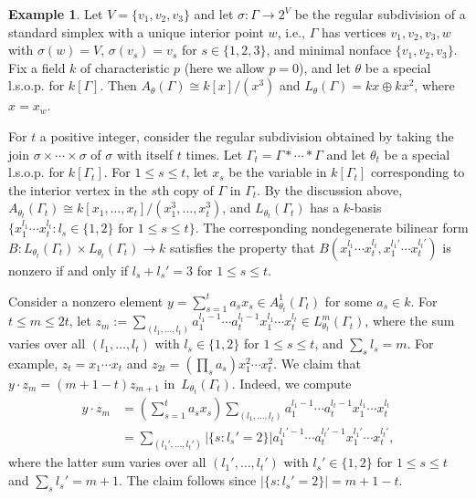 \documentclass[11pt]{article}
\theoremstyle{definition}
\newtheorem{example}[theo]{Example}
\numberwithin{equation}{section}
\numberwithin{equation}{section}
\begin{document}
\begin{example}\label{ex:counterexamples}
Let $V = \{ v_1, v_2 , v_3 \}$ and let $\sigma \colon \Gamma \to 2^V$ be 
the regular subdivision of a standard simplex with a unique interior point $w$, i.e., $\Gamma$ has vertices $v_1,v_2,v_3, w$ with $\sigma(w) = V$, $\sigma(v_s) = v_s$ for $s \in \{ 1,2,3\}$, and minimal nonface $\{ v_1, v_2, v_3 \}$. 
Fix a field $k$ of characteristic $p$ (here we allow $p = 0$), 
and let $\theta$ be a special l.s.o.p. for $k[\Gamma]$. 
Then $A_\theta(\Gamma) \cong k[x]/(x^3)$ and $L_\theta(\Gamma) = k x \oplus k x^2$, where $x = x_w$. 


For $t$ a positive integer, consider the regular subdivision obtained by taking the join $\sigma \times \cdots \times \sigma$ of $\sigma$ with itself $t$ times. Let $\Gamma_t = \Gamma * \cdots * \Gamma$ and let $\theta_t$ be a special l.s.o.p. for $k[\Gamma_t]$. 
For $1 \le s \le t$,  let $x_s$ be the variable in $k[\Gamma_t]$ corresponding to the interior vertex in the $s$th copy of $\Gamma$ in $\Gamma_t$.
By the discussion above,
$A_{\theta_t}(\Gamma_t) \cong k[x_1,\ldots,x_t]/(x_1^3,\ldots,x_t^3)$, and 
$L_{\theta_t}(\Gamma_t)$ has a $k$-basis \mbox{$\{ x_1^{l_1}\cdots x_t^{l_t} : l_s \in \{ 1,2 \} \textrm{ for } 1 \le s \le t \}$}. 
The corresponding nondegenerate bilinear form $B \colon L_{\theta_t}(\Gamma_t) \times L_{\theta_t}(\Gamma_t) \to k$ satisfies the property that
$B(x_1^{l_1}\cdots x_t^{l_t}, x_1^{l_1'}\cdots x_t^{l_t'})$ is nonzero if and only if $l_s + l_{s}' = 3$ for $1 \le s \le t$. 


Consider a nonzero element $y = \sum_{s = 1}^t a_s x_s \in A_{\theta_t}^1(\Gamma_t)$ for some $a_s \in k$. 
For \mbox{$t \le m \le 2t$}, let $z_m := \sum_{(l_1,\ldots,l_t)} a_1^{l_1 - 1}\cdots a_t^{l_t - 1} x_1^{l_1}\cdots x_t^{l_t} \in L^m_{\theta_t}(\Gamma_t)$, where the sum varies over all $(l_1,\ldots,l_t)$ with $l_s \in \{ 1,2 \}$ for $1 \le s \le t$, and $\sum_s l_s = m$. For example, $z_t = x_1 \cdots x_t$ and $z_{2t} = (\prod_s a_s) x_1^2 \cdots x_t^2$. We claim that $y \cdot z_m = (m + 1 - t) z_{m + 1}$ in~$L_{\theta_t}(\Gamma_t)$. Indeed, we compute 
\begin{align*}
	y \cdot z_m &= \left( \sum_{s = 1}^t a_s x_s \right) \sum_{(l_1,\ldots,l_t)} a_1^{l_1 - 1}\cdots a_t^{l_t - 1} x_1^{l_1}\cdots x_t^{l_t} \\
&= \sum_{(l_1',\ldots,l_t')} |\{ s : l_s' = 2 \}|	 a_1^{l_1' - 1}\cdots a_t^{l_t' - 1} x_1^{l_1'}\cdots x_t^{l_t'}, 
\end{align*}
where  the latter sum varies over all $(l_1',\ldots,l_t')$ with $l_s' \in \{ 1,2 \}$ for $1 \le s \le t$ and $\sum_s l_s' = m + 1$. The claim follows since $|\{ s : l_s' = 2 \}| = m + 1 - t$. 


\end{example}
\end{document}
